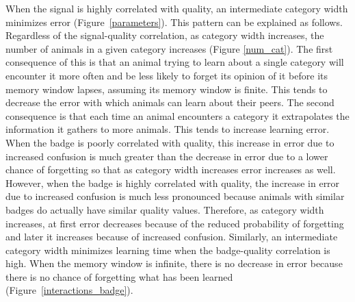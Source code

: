  
When the signal is highly correlated with quality, an intermediate category width minimizes error (Figure~\ref{parameters}). This pattern can be explained as follows. Regardless of the signal-quality correlation, as category width increases, the number of animals in a given category increases (Figure \ref{num_cat}). The first consequence of this is that an animal trying to learn about a single category will encounter it more often and be less likely to forget its opinion of it before its memory window lapses, assuming its memory window is finite. This tends to decrease the error with which animals can learn about their peers. The second consequence is that each time an animal encounters a category it extrapolates the information it gathers to more animals. This tends to increase learning error. When the badge is poorly correlated with quality, this increase in error due to increased confusion is much greater than the decrease in error due to a lower chance of forgetting so that as category width increases error increases as well. However, when the badge is highly correlated with quality, the increase in error due to increased confusion is much less pronounced because animals with similar badges do actually have similar quality values. Therefore, as category width increases, at first error decreases because of the reduced probability of forgetting and later it increases because of increased confusion. Similarly, an intermediate category width minimizes learning time when the badge-quality correlation is high. When the memory window is infinite, there is no decrease in error because there is no chance of forgetting what has been learned (Figure~\ref{interactions_badge}).

